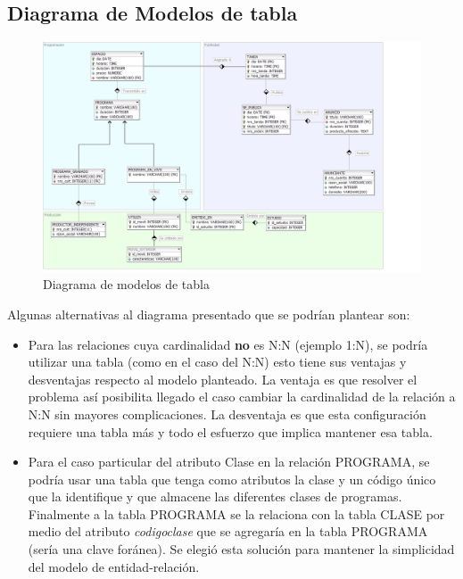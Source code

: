 \documentclass[a4paper,10pt]{article}
\begin{document}
  \subsection{Diagrama de Modelos de tabla}  
		\begin{figure}[H]
			\begin{center}
				\includegraphics[scale=0.35]{der.png}
				\caption{Diagrama de modelos de tabla}
				\label{fig:flujos}
			\end{center}
		\end{figure}
		
		\begin{flushleft}
    	Algunas alternativas al diagrama presentado que se podr\'ian plantear son:
    \end{flushleft}  
    
    \begin{itemize}
    	\item Para las relaciones cuya cardinalidad \textbf{no} es N:N (ejemplo 1:N), se podr\'ia utilizar una tabla (como en el caso del N:N) esto tiene sus ventajas y desventajas respecto al modelo planteado. La ventaja es que resolver el problema as\'i posibilita llegado el caso cambiar la cardinalidad de la relaci\'on a N:N sin mayores complicaciones. La desventaja es que esta configuraci\'on requiere una tabla m\'as y todo el esfuerzo que implica mantener esa tabla.
    	\item Para el caso particular del atributo Clase en la relaci\'on PROGRAMA, se podr\'ia usar una tabla que tenga como atributos la clase y un c\'odigo \'unico que la identifique y que almacene las diferentes clases de programas. Finalmente a la tabla PROGRAMA se la relaciona con la tabla CLASE por medio del atributo \textit{codigoclase} que se agregar\'ia en la tabla PROGRAMA (ser\'ia una clave for\'anea).
    	Se elegi\'o esta soluci\'on para mantener la simplicidad del modelo de entidad-relaci\'on.
    \end{itemize}
    
\end{document}
